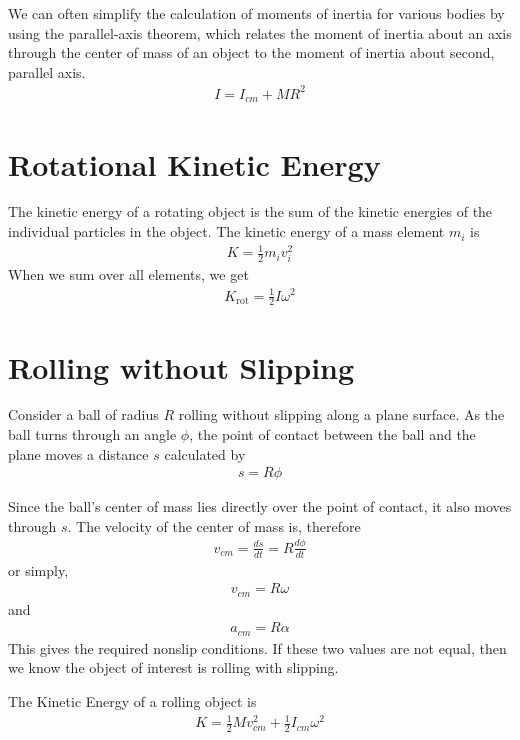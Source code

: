 \documentclass[11pt]{article}
\begin{document}
We can often simplify the calculation of moments of inertia for various bodies by using the parallel-axis theorem, which relates the moment of inertia about an axis through the center of mass of an object to the moment of inertia about second, parallel axis. 
\begin{align*}
    I = I_{cm} + MR^2
\end{align*}

\section{Rotational Kinetic Energy}

The kinetic energy of a rotating object is the sum of the kinetic energies of the individual particles in the object. The kinetic energy of a mass element $m_i$ is
\begin{align*}
    K = \frac{1}{2}m_i v_i^2
\end{align*}
When we sum over all elements, we get
\begin{align*}
    K_{\text{rot}} = \frac{1}{2}I\omega^2
\end{align*}

\section{Rolling without Slipping}
Consider a ball of radius $R$ rolling without slipping along a plane surface. As the ball turns through an angle $\phi$, the point of contact between the ball and the plane moves a distance $s$ calculated by
\begin{align*}
    s = R\phi
\end{align*}

Since the ball's center of mass lies directly over the point of contact, it also moves through $s$. The velocity of the center of mass is, therefore
\begin{align*}
    v_{cm} = \frac{ds}{dt} = R\frac{d\phi}{dt}
\end{align*}
or simply,
\begin{align*}
    v_{cm} = R\omega
\end{align*}
and
\begin{align*}
    a_{cm} = R\alpha
\end{align*}
This gives the required nonslip conditions. If these two values are not equal, then we know the object of interest is rolling with slipping.

The Kinetic Energy of a rolling object is
\begin{align*}
    K = \frac{1}{2}Mv_{cm}^2  + \frac{1}{2}I_{cm}\omega^2
\end{align*}
\end{document}
